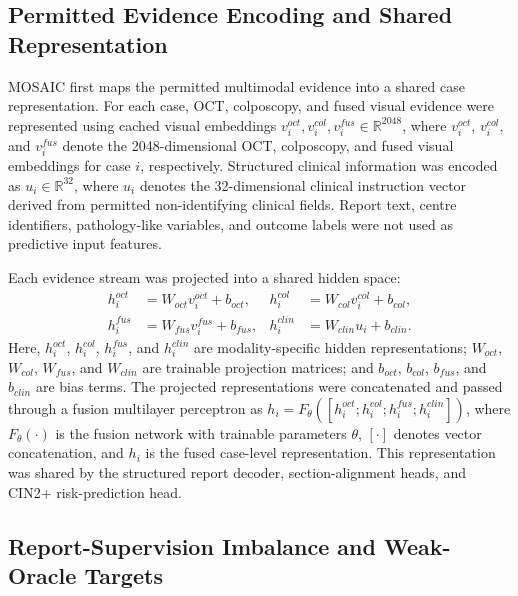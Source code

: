 \documentclass[11pt, a4paper]{article}
\theoremstyle{plain}
\theoremstyle{definition}
\begin{document}
\subsection{Permitted Evidence Encoding and Shared Representation}
\label{subsec:methods_encoding}

MOSAIC first maps the permitted multimodal evidence into a shared case representation. For each case, OCT, colposcopy, and fused visual evidence were represented using cached visual embeddings \(v_i^{oct},v_i^{col},v_i^{fus}\in\mathbb{R}^{2048}\), where \(v_i^{oct}\), \(v_i^{col}\), and \(v_i^{fus}\) denote the 2048-dimensional OCT, colposcopy, and fused visual embeddings for case \(i\), respectively. Structured clinical information was encoded as \(u_i\in\mathbb{R}^{32}\), where \(u_i\) denotes the 32-dimensional clinical instruction vector derived from permitted non-identifying clinical fields. Report text, centre identifiers, pathology-like variables, and outcome labels were not used as predictive input features.

Each evidence stream was projected into a shared hidden space:
\begin{equation}
\begin{aligned}
h_i^{oct} &= W_{oct}v_i^{oct}+b_{oct}, &
h_i^{col} &= W_{col}v_i^{col}+b_{col},\\
h_i^{fus} &= W_{fus}v_i^{fus}+b_{fus}, &
h_i^{clin} &= W_{clin}u_i+b_{clin}.
\end{aligned}
\end{equation}
Here, \(h_i^{oct}\), \(h_i^{col}\), \(h_i^{fus}\), and \(h_i^{clin}\) are modality-specific hidden representations; \(W_{oct}\), \(W_{col}\), \(W_{fus}\), and \(W_{clin}\) are trainable projection matrices; and \(b_{oct}\), \(b_{col}\), \(b_{fus}\), and \(b_{clin}\) are bias terms. The projected representations were concatenated and passed through a fusion multilayer perceptron as \(h_i=F_{\theta}([h_i^{oct};h_i^{col};h_i^{fus};h_i^{clin}])\), where \(F_{\theta}(\cdot)\) is the fusion network with trainable parameters \(\theta\), \([\cdot]\) denotes vector concatenation, and \(h_i\) is the fused case-level representation. This representation was shared by the structured report decoder, section-alignment heads, and CIN2+ risk-prediction head.

\subsection{Report-Supervision Imbalance and Weak-Oracle Targets}
\label{subsec:methods_report_imbalance}
\end{document}
